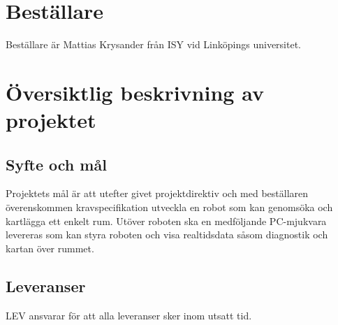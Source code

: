\documentclass[a4paper,11pt]{article}
\begin{document}
\pagestyle{intro}
\LIPStitelsida
\clearpage
\begin{LIPSprojektidentitet}
\end{LIPSprojektidentitet}
\clearpage
\renewcommand{\familydefault}{\sfdefault}	%
\normalfont
\tableofcontents
\renewcommand{\familydefault}{\rmdefault}	%
\normalfont
\clearpage
\begin{LIPSdokumenthistorik}
\end{LIPSdokumenthistorik}
\clearpage
\setcounter{page}{1}
\pagestyle{content}
\section{Beställare}
Beställare är Mattias Krysander från ISY vid Linköpings universitet.

\section{Översiktlig beskrivning av projektet}
\subsection{Syfte och mål}
Projektets mål är att utefter givet projektdirektiv och med beställaren överenskommen kravspecifikation utveckla en robot som kan genomsöka och kartlägga ett enkelt rum. Utöver roboten ska en medföljande PC-mjukvara levereras som kan styra roboten och visa realtidsdata såsom diagnostik och kartan över rummet.

\subsection{Leveranser}
LEV ansvarar för att alla leveranser sker inom utsatt tid. 
\end{document}
